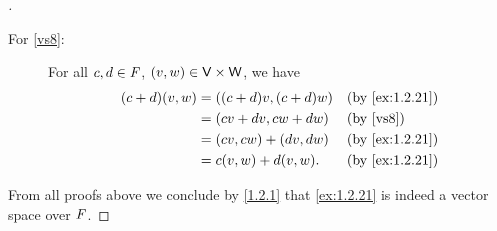 \begin{proof}[]
\begin{description}
    \item[For \ref{vs8}:]
      For all \(c, d \in \mathit{F}\), \((v, w) \in \mathsf{V} \times \mathsf{W}\), we have
      \begin{align*}
        (c + d) (v, w) & = ((c + d) v, (c + d) w) &  & \by{ex:1.2.21}        \\
                       & = (cv + dv, cw + dw)     &  & \text{(by \ref{vs8})} \\
                       & = (cv, cw) + (dv, dw)    &  & \by{ex:1.2.21}        \\
                       & = c(v, w) + d(v, w).     &  & \by{ex:1.2.21}
      \end{align*}
  \end{description}
  From all proofs above we conclude by \cref{1.2.1} that \cref{ex:1.2.21} is indeed a vector space over \(\mathit{F}\).
\end{proof}
